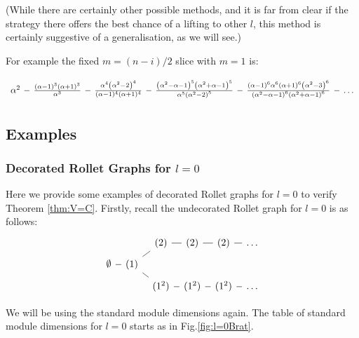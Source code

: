 (While there are certainly other possible methods, and it is far from clear if the strategy there offers the best chance of a lifting to other $l$,
this method is certainly suggestive of a generalisation, as we will see.) 


\mdef  
For example the fixed $m = (n-i)/2$ slice with $m=1$ is: 
\[
\begin{tikzcd}[row sep=tiny,column sep=tiny]
    \a^2\ar[r,dash]&\frac{(\alpha -1)^3 (\alpha +1)^3}{\alpha ^3}\ar[r,dash]&\frac{\alpha ^4 \left(\alpha ^2-2\right)^4}{(\alpha -1)^4 (\alpha +1)^4}\ar[r,dash]&\frac{\left(\alpha ^2-\alpha -1\right)^5 \left(\alpha ^2+\alpha -1\right)^5}{\alpha ^5 \left(\alpha ^2-2\right)^5}\ar[r,dash]&\frac{(\alpha -1)^6 \alpha ^6 (\alpha +1)^6 \left(\alpha ^2-3\right)^6}{\left(\alpha ^2-\alpha -1\right)^6 \left(\alpha ^2+\alpha -1\right)^6}\ar[r,dash]&\dots
\end{tikzcd}
\]


\subsection{Examples} 

\subsubsection{Decorated Rollet Graphs for $l=0$}   \label{ss:gdetl0}

Here we provide some examples of decorated Rollet graphs for $l=0$ to verify Theorem \ref{thm:V=C}. Firstly, recall the undecorated Rollet graph for $l=0$ is as follows:
\[
\begin{tikzcd}[row sep=tiny,column sep=tiny]&&(2)\ar[r,dash]&(2)\ar[r,dash]&(2)\ar[r,dash]&\dots\\
    \emptyset\ar[r,dash]&(1)\ar[ur,dash]\ar[dr,dash]\\
    &&(1^2)\ar[r,dash]&(1^2)\ar[r,dash]&(1^2)\ar[r,dash]&\dots
\end{tikzcd}
\]

\mdef   \label{pa:l0OEIS}
We will be using the standard module dimensions again. 
The table of standard module dimensions for $l=0$ starts as in Fig.\ref{fig:l=0Brat}. 


